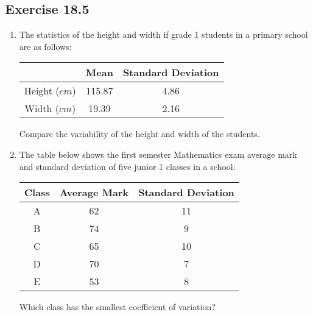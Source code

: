 \documentclass{report}
\begin{document}
\begin{multicols}{2}
  \subsection{Exercise 18.5}

  \begin{enumerate}
    \item The statistics of the height and width if grade 1 students in a primary school
          are as follows:
          \begin{center}
            \begin{tabular}{|c|c|c|}
              \hline
                            & Mean   & Standard Deviation \\
              \hline
              Height ($cm$) & 115.87 & 4.86               \\
              Width ($cm$)  & 19.39  & 2.16               \\
              \hline
            \end{tabular}
          \end{center}
          Compare the variability of the height and width of the students.

    \item The table below shows the first semester Mathematics exam average mark and
          standard deviation of five junior 1 classes in a school:
          \begin{center}
            \begin{tabular}{|c|c|c|}
              \hline
              Class & Average Mark & Standard Deviation \\
              \hline
              A     & 62           & 11                 \\
              B     & 74           & 9                  \\
              C     & 65           & 10                 \\
              D     & 70           & 7                  \\
              E     & 53           & 8                  \\
              \hline
            \end{tabular}
          \end{center}
          Which class has the smallest coefficient of variation?


\end{enumerate}
\end{multicols}
\end{document}
